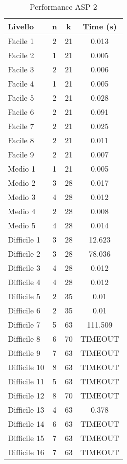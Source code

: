 \documentclass{article}
\begin{document}
\begin{multicols*}{2}
\begin{table}[H]
    \centering
    \begin{tabular}{|l|c|c|c|}
        \hline
        \textbf{Livello} & \textbf{n} & \textbf{k} & \textbf{Time (s)} \\
        \hline
        Facile 1     & 2  & 21 & 0.013 \\
        Facile 2     & 1  & 21 & 0.005 \\
        Facile 3     & 2  & 21 & 0.006 \\
        Facile 4     & 1  & 21 & 0.005 \\
        Facile 5     & 2  & 21 & 0.028 \\
        Facile 6     & 2  & 21 & 0.091 \\
        Facile 7     & 2  & 21 & 0.025 \\
        Facile 8     & 2  & 21 & 0.011 \\
        Facile 9     & 2  & 21 & 0.007 \\
        Medio 1      & 1  & 21 & 0.005 \\
        Medio 2      & 3  & 28 & 0.017 \\
        Medio 3      & 4  & 28 & 0.012 \\
        Medio 4      & 2  & 28 & 0.008 \\
        Medio 5      & 4  & 28 & 0.014 \\
        Difficile 1  & 3  & 28 & 12.623 \\
        Difficile 2  & 3  & 28 & 78.036 \\
        Difficile 3  & 4  & 28 & 0.012 \\
        Difficile 4  & 4  & 28 & 0.012 \\
        Difficile 5  & 2  & 35 & 0.01 \\
        Difficile 6  & 2  & 35 & 0.01 \\
        Difficile 7  & 5  & 63 & 111.509 \\
        Difficile 8  & 6  & 70 & TIMEOUT \\
        Difficile 9  & 7  & 63 & TIMEOUT \\
        Difficile 10 & 8  & 63 & TIMEOUT \\
        Difficile 11 & 5  & 63 & TIMEOUT \\
        Difficile 12 & 8  & 70 & TIMEOUT \\
        Difficile 13 & 4  & 63 & 0.378 \\
        Difficile 14 & 6  & 63 & TIMEOUT \\
        Difficile 15 & 7  & 63 & TIMEOUT \\
        Difficile 16 & 7  & 63 & TIMEOUT \\
        \hline
    \end{tabular}
    \caption{Performance ASP 2}
    \label{tab:timeout2}
\end{table}


\end{multicols*}
\end{document}
